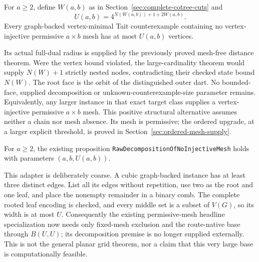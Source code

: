 \begin{theorem}
For $a\ge2$, define $W(a,b)$ as in Section~\ref{sec:complete-cotree-cuts}
and
\[
             U(a,b)=4^{N(W(a,b))+1+2W(a,b)}.
\]
Every graph-backed vertex-minimal Tait counterexample containing no
vertex-injective permissive $a\times b$ mesh has at most $U(a,b)$ vertices.
\end{theorem}

Its actual full-dual radius is supplied by the previously proved
mesh-free distance theorem.  Were the vertex bound violated, the
large-cardinality theorem would supply $N(W)+1$ strictly nested nodes,
contradicting their checked state bound $N(W)$.  The root face is the
orbit of the distinguished outer dart.  No bounded-face, supplied
decomposition or unknown-counterexample-size parameter remains.
Equivalently, any larger instance in that exact target class supplies a
vertex-injective permissive $a\times b$ mesh.
This positive structural alternative assumes neither a chain nor mesh
absence.  Its mesh is permissive; the ordered upgrade, at a larger explicit
threshold, is proved in Section~\ref{sec:ordered-mesh-supply}.

\begin{proposition}
For $a\ge2$, the existing proposition
\texttt{RawDecompositionOfNoInjectiveMesh} holds with parameters
$(a,b,U(a,b))$.
\end{proposition}

This adapter is deliberately coarse.  A cubic graph-backed instance has
at least three distinct edges.  List all its edges without repetition,
use two as the root and one leaf, and place the nonempty remainder in a
binary comb.  The complete rooted leaf encoding is checked, and every
middle set is a subset of $V(G)$, so its width is at most $U$.
Consequently the existing permissive-mesh headline specialization now
needs only fixed-mesh exclusion and the route-native base through
$B(U,U)$; its decomposition premise is no longer supplied externally.
This is not the general planar grid theorem, nor a claim that this very
large base is computationally feasible.

